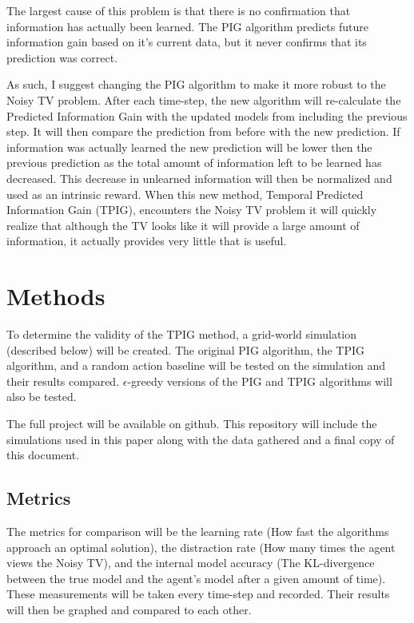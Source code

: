 \documentclass[12pt]{thesis}
\begin{document}
The largest cause of this problem is that there is no confirmation that information has actually been learned. The PIG algorithm predicts future information gain based on it’s current data, but it never confirms that its prediction was correct.

As such, I suggest changing the PIG algorithm to make it more robust to the Noisy TV problem. After each time-step, the new algorithm will re-calculate the Predicted Information Gain with the updated models from including the previous step. It will then compare the prediction from before with the new prediction. If information was actually learned the new prediction will be lower then the previous prediction as the total amount of information left to be learned has decreased. This decrease in unlearned information will then be normalized and used as an intrinsic reward. When this new method, Temporal Predicted Information Gain (TPIG), encounters the Noisy TV problem it will quickly realize that although the TV looks like it will provide a large amount of information, it actually provides very little that is useful.

\section{Methods}
To determine the validity of the TPIG method, a grid-world simulation (described below) will be created. The original PIG algorithm, the TPIG algorithm, and a random action baseline will be tested on the simulation and their results compared. $\epsilon$-greedy versions of the PIG and TPIG algorithms will also be tested.

The full project will be available on github.\cite{TPIG:github} This repository will include the simulations used in this paper along with the data gathered and a final copy of this document.

\subsection{Metrics}
The metrics for comparison will be the learning rate (How fast the algorithms approach an optimal solution), the distraction rate (How many times the agent views the Noisy TV), and the internal model accuracy (The KL-divergence between the true model and the agent's model after a given amount of time). These measurements will be taken every time-step and recorded. Their results will then be graphed and compared to each other.
\end{document}
